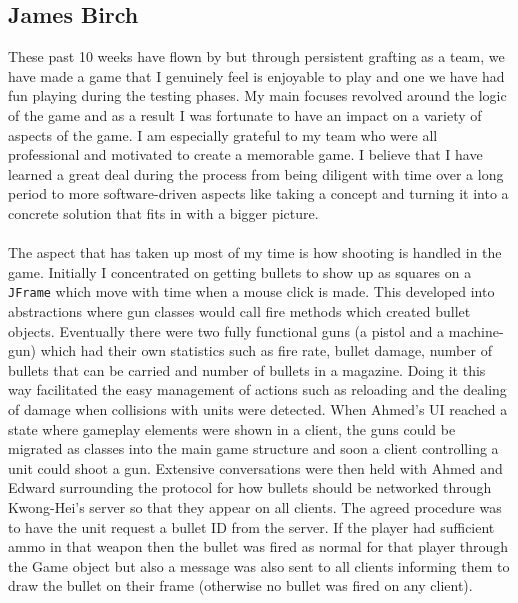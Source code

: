 \documentclass[12pt]{article}
\newcommand{\return}{\\\\\noindent}
\begin{document}
\subsection{James Birch}
These past 10 weeks have flown by but through persistent grafting as a team, we have made a game that I genuinely feel is enjoyable to play and one we have had fun playing during the testing phases. My main focuses revolved around the logic of the game and as a result I was fortunate to have an impact on a variety of aspects of the game. I am especially grateful to my team who were all professional and motivated to create a memorable game. I believe that I have learned a great deal during the process from being diligent with time over a long period to more software-driven aspects like taking a concept and turning it into a concrete solution that fits in with a bigger picture.\return
The aspect that has taken up most of my time is how shooting is handled in the game. Initially I concentrated on getting bullets to show up as squares on a \texttt{JFrame} which move with time when a mouse click is made. This developed into abstractions where gun classes would call fire methods which created bullet objects. Eventually there were two fully functional guns (a pistol and a machine-gun) which had their own statistics such as fire rate, bullet damage, number of bullets that can be carried and number of bullets in a magazine. Doing it this way facilitated the easy management of actions such as reloading and the dealing of damage when collisions with units were detected. When Ahmed's UI reached a state where gameplay elements were shown in a client, the guns could be migrated as classes into the main game structure and soon a client controlling a unit could shoot a gun. Extensive conversations were then held with Ahmed and Edward surrounding the protocol for how bullets should be networked through Kwong-Hei's server so that they appear on all clients. The agreed procedure was to have the unit request a bullet ID from the server. If the player had sufficient ammo in that weapon then the bullet was fired as normal for that player through the Game object but also a message was also sent to all clients informing them to draw the bullet on their frame (otherwise no bullet was fired on any client).\return
\end{document}
